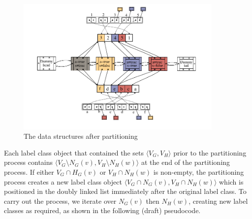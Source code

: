 \FloatBarrier

\begin{figure}[h!]
    \centering
    \includegraphics*[width=0.9\textwidth]{14b-mcsplit-induced-si/figs/data-structure-step-3}
    \caption{The data structures after partitioning}
    \label{figure:si-data-structures-3}
\end{figure}

\FloatBarrier

Each label class object that contained the sets $\langle V_G, V_H \rangle$ prior
to the partitioning process contains $\langle V_G \setminus N_G(v), V_H \setminus N_H(w)\rangle$
at the end of the partitioning process.  If either $V_G \cap H_G(v)$ or $V_H \cap N_H(w)$
is non-empty, the partitioning process creates a new label class object
$\langle V_G \cap N_G(v), V_H \cap N_H(w)\rangle$ which is
positioned in the doubly linked list immediately after the original label class.
To carry out the process, we iterate over $N_G(v)$ then $N_H(w)$,
creating new label classes as required, as shown in
the following (draft) pseudocode.

